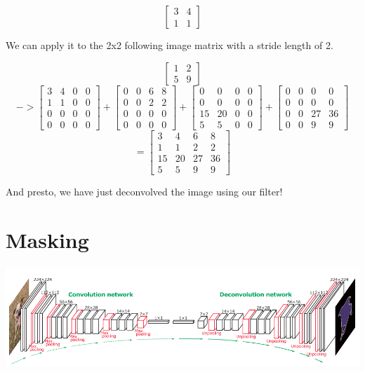 \documentclass{article}
\begin{document}
\[
\begin{bmatrix}
    3 & 4 \\
    1 & 1
\end{bmatrix}
\]

We can apply it to the 2x2 following image matrix with a stride length of 2.

\[
\begin{bmatrix}
    1 & 2 \\
    5 & 9
\end{bmatrix}
\]
\[
->
\begin{bmatrix}
    3 & 4 & 0 & 0 \\
    1 & 1 & 0 & 0 \\
    0 & 0 & 0 & 0 \\
    0 & 0 & 0 & 0
\end{bmatrix}
+
\begin{bmatrix}
    0 & 0 & 6 & 8 \\
    0 & 0 & 2 & 2 \\
    0 & 0 & 0 & 0 \\
    0 & 0 & 0 & 0
\end{bmatrix}
+
\begin{bmatrix}
    0 & 0 & 0 & 0 \\
    0 & 0 & 0 & 0 \\
    15 & 20 & 0 & 0 \\
    5 & 5 & 0 & 0
\end{bmatrix}
+
\begin{bmatrix}
    0 & 0 & 0 & 0 \\
    0 & 0 & 0 & 0 \\
    0 & 0 & 27 & 36 \\
    0 & 0 & 9 & 9
\end{bmatrix} 
\]
\[
= 
\begin{bmatrix}
    3 & 4 & 6 & 8 \\
    1 & 1 & 2 & 2 \\
    15 & 20 & 27 & 36 \\
    5 & 5 & 9 & 9
\end{bmatrix}
\]

And presto, we have just deconvolved the image using our filter!

\section{Masking}
\begin{center}
\includegraphics[scale=0.30]{masking}
\end{center}
\end{document}
